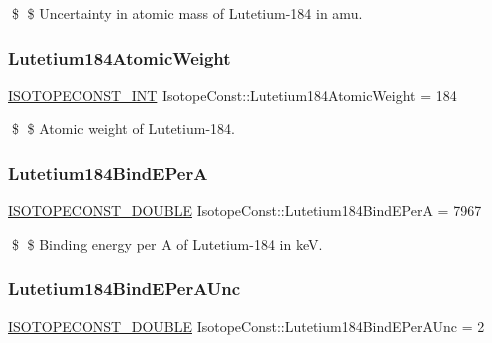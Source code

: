 \$ \$ Uncertainty in atomic mass of Lutetium-\/184 in amu. \mbox{\label{group___isotope_const-_lutetium-_lu184_ga394fc9fc9b8e63e9343aba95a8afba2b}} 
\subsubsection{\texorpdfstring{Lutetium184\+Atomic\+Weight}{Lutetium184AtomicWeight}}
{\footnotesize\ttfamily \mbox{\hyperlink{group___isotope_const-_macros_ga5f18360b3e99483a35c32d789e62621c}{I\+S\+O\+T\+O\+P\+E\+C\+O\+N\+S\+T\+\_\+\+I\+NT}} Isotope\+Const\+::\+Lutetium184\+Atomic\+Weight = 184}

\$ \$ Atomic weight of Lutetium-\/184. \mbox{\label{group___isotope_const-_lutetium-_lu184_ga27b37b6e0df5ec3a7b08eba933bd7556}} 
\subsubsection{\texorpdfstring{Lutetium184\+Bind\+E\+PerA}{Lutetium184BindEPerA}}
{\footnotesize\ttfamily \mbox{\hyperlink{group___isotope_const-_macros_ga8f45a7272ce02c0b4c65c44636ed719a}{I\+S\+O\+T\+O\+P\+E\+C\+O\+N\+S\+T\+\_\+\+D\+O\+U\+B\+LE}} Isotope\+Const\+::\+Lutetium184\+Bind\+E\+PerA = 7967}

\$ \$ Binding energy per A of Lutetium-\/184 in keV. \mbox{\label{group___isotope_const-_lutetium-_lu184_ga24c283a6aa9aaacca4c6860f86662bd5}} 
\subsubsection{\texorpdfstring{Lutetium184\+Bind\+E\+Per\+A\+Unc}{Lutetium184BindEPerAUnc}}
{\footnotesize\ttfamily \mbox{\hyperlink{group___isotope_const-_macros_ga8f45a7272ce02c0b4c65c44636ed719a}{I\+S\+O\+T\+O\+P\+E\+C\+O\+N\+S\+T\+\_\+\+D\+O\+U\+B\+LE}} Isotope\+Const\+::\+Lutetium184\+Bind\+E\+Per\+A\+Unc = 2}


